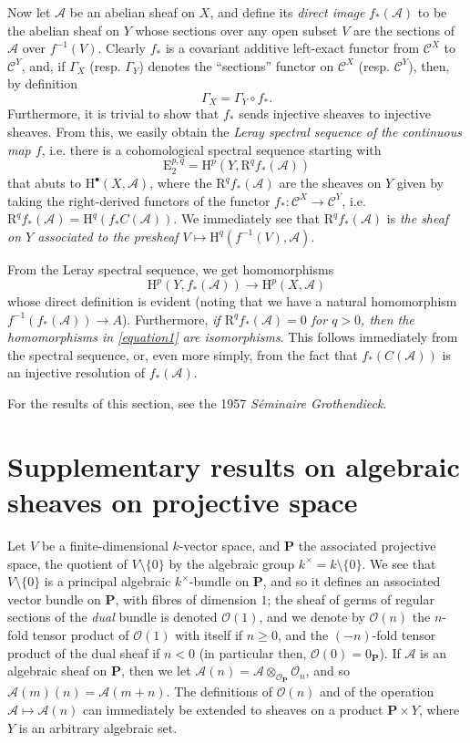 \documentclass{article}
\theoremstyle{plain}
\theoremstyle{definition}
\newcommand{\sh}[1]{{\mathscr{#1}}}
\newcommand{\cat}[1]{{\mathcal{#1}}}
\newcommand{\HH}{\mathrm{H}}
\newcommand{\EE}{\mathrm{E}}
\newcommand{\RR}{\mathrm{R}}
\renewcommand{\geq}{\geqslant}
\newcommand{\oldpage}[1]{\marginpar{\footnotesize$\Big\vert$ \textit{p.~#1}}}
\begin{document}
Now let $\sh{A}$ be an abelian sheaf on $X$, and define its \emph{direct image} $f_*(\sh{A})$ to be the abelian sheaf on $Y$ whose sections over any open subset $V$ are the sections of $\sh{A}$ over $f^{-1}(V)$.
Clearly $f_*$ is a covariant additive left-exact functor from $\cat{C}^X$ to $\cat{C}^Y$, and, if $\Gamma_X$ (resp. $\Gamma_Y$) denotes the ``sections'' functor on $\cat{C}^X$ (resp. $\cat{C}^Y$), then, by definition
\[
  \Gamma_X = \Gamma_Y\circ f_*.
\]
Furthermore, it is trivial to show that $f_*$ sends injective sheaves to injective sheaves.
From this, we easily obtain the \emph{Leray spectral sequence of the continuous map $f$}, i.e. there is a cohomological spectral sequence starting with
\[
  \EE_2^{p,q} = \HH^p(Y,\RR^qf_*(\sh{A}))
\]
that abuts to $\HH^\bullet(X,\sh{A})$, where the $\RR^qf_*(\sh{A})$ are the sheaves on $Y$ given by taking the right-derived functors of the functor $f_*\colon\cat{C}^X\to\cat{C}^Y$, i.e. $\RR^qf_*(\sh{A}) = \HH^q(f_*C(\sh{A}))$.
We immediately see that $\RR^qf_*(\sh{A})$ is \emph{the sheaf on $Y$ associated to the presheaf $V\mapsto\HH^q(f^{-1}(V),\sh{A})$}.

From the Leray spectral sequence, we get homomorphisms
\[
\label{equation1}
  \HH^p(Y,f_*(\sh{A})) \to \HH^p(X,\sh{A})
  \tag{1}
\]
whose direct definition is evident (noting that we have a natural homomorphism $f^{-1}(f_*(\sh{A}))\to A$).
Furthermore, \emph{if $\RR^qf_*(\sh{A})=0$ for $q>0$, then the}
\oldpage{2-06}
\emph{homomorphisms in \cref{equation1} are isomorphisms}.
This follows immediately from the spectral sequence, or, even more simply, from the fact that $f_*(C(\sh{A}))$ is an injective resolution of $f_*(\sh{A})$.

For the results of this section, see the 1957 \emph{S\'{e}minaire Grothendieck}.


\section{Supplementary results on algebraic sheaves on projective space}
\label{section4}

Let $V$ be a finite-dimensional $k$-vector space, and $\mathbf{P}$ the associated projective space, the quotient of $V\setminus\{0\}$ by the algebraic group $k^\times=k\setminus\{0\}$.
We see that $V\setminus\{0\}$ is a principal algebraic $k^\times$-bundle on $\mathbf{P}$, and so it defines an associated vector bundle on $\mathbf{P}$, with fibres of dimension $1$;
the sheaf of germs of regular sections of the \emph{dual} bundle is denoted $\sh{O}(1)$, and we denote by $\sh{O}(n)$ the $n$-fold tensor product of $\sh{O}(1)$ with itself if $n\geq0$, and the $(-n)$-fold tensor product of the dual sheaf if $n<0$ (in particular then, $\sh{O}(0)=\sh{0}_\mathbf{P}$).
If $\sh{A}$ is an algebraic sheaf on $\mathbf{P}$, then we let $\sh{A}(n)=\sh{A}\otimes_{\sh{O}_\mathbf{P}}\sh{O}_n$, and so $\sh{A}(m)(n)=\sh{A}(m+n)$.
The definitions of $\sh{O}(n)$ and of the operation $\sh{A}\mapsto\sh{A}(n)$ can immediately be extended to sheaves on a product $\mathbf{P}\times Y$, where $Y$ is an arbitrary algebraic set.
\end{document}
